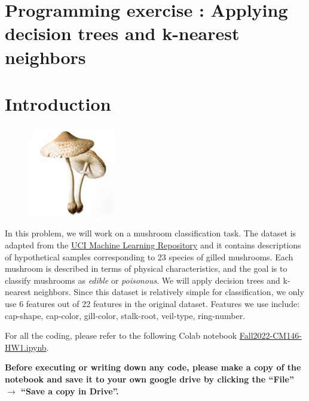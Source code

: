 \newpage
\section{Programming exercise : Applying decision trees and k-nearest neighbors }

\section*{Introduction}

\begin{figure}[ht]
\centering
\includegraphics[scale=2.5]{mushroom.jpg}
\end{figure}

In this problem, we will work on a mushroom classification task. The dataset is adapted from the \href{https://archive.ics.uci.edu/ml/datasets/mushroom}{UCI Machine Learning Repository} and it contains descriptions of hypothetical samples corresponding to 23 species of gilled mushrooms. Each mushroom is described in terms of physical characteristics, and the goal is to classify mushrooms as \emph{edible} or \emph{poisonous}. We will apply decision trees and k-nearest neighbors. Since this dataset is relatively simple for classification, we only use 6 features out of 22 features in the original dataset. Features we use include: 
cap-shape, cap-color, gill-color, stalk-root, veil-type, ring-number.


For all the coding, please refer to the following Colab notebook  
\href{https://colab.research.google.com/drive/13_JuaV8-uwTBO7YEheYGm3cjl8DZB8HA?usp=sharing}{Fall2022-CM146-HW1.ipynb}. 

\textbf{Before executing or writing down any code, please make a copy of the notebook and save it to your own google drive by clicking the “File” $\rightarrow$ “Save a copy in Drive”.} 

